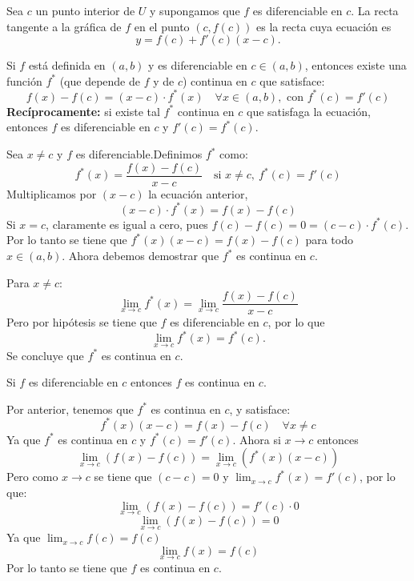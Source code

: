 \begin{definicion}
Sea $c$ un punto interior de $U$ y supongamos que $f$ es diferenciable en $c$. La recta tangente a la gráfica de $f$ en el punto $(c, f(c))$ es la recta  cuya ecuación es 
 \begin{equation}\label{def-tangente}
 y=f(c)+f'(c)(x-c) .
 \end{equation}
\end{definicion}
\begin{teorema}
    Si $f$ está definida en $(a, b)$ y es diferenciable en $c \in (a, b)$, entonces existe una función $f^*$ (que depende de $f$ y de $c$) continua en $c$ que satisface:
\[f(x) - f(c) = (x - c) \cdot f^*(x) \quad \forall x \in (a, b), \text{ con } f^*(c) = f'(c)\]
\textbf{Recíprocamente:} si existe tal $f^*$ continua en $c$ que satisfaga la ecuación, entonces $f$ es diferenciable en $c$ y $f'(c) = f^*(c)$.

\end{teorema}
\begin{prueba}
    Sea $x \neq c$ y $f$ es diferenciable.Definimos $f^{*}$ como:
\[f^*(x) = \frac{f(x) - f(c)}{x - c} \quad \text{si } x \neq c, \ f^*(c) = f'(c)\]
Multiplicamos por $(x - c)$ la ecuación anterior,
\[(x - c) \cdot f^*(x) = f(x) - f(c)\]
Si $x = c$, claramente es igual a cero, pues $f(c) - f(c) = 0 = (c - c) \cdot f^*(c)$. Por lo tanto se tiene que $f^*(x)(x - c) = f(x) - f(c)$ para todo $x \in (a, b)$.
Ahora debemos demostrar que $f^*$ es continua en $c$.

Para $x \neq c$:
\[\lim_{x \to c} f^*(x) = \lim_{x \to c} \frac{f(x) - f(c)}{x - c}\]
Pero por hipótesis se tiene que $f$ es diferenciable en $c$, por lo que
\[\lim_{x \to c} f^*(x) = f^*(c).\]
Se concluye que $f^*$ es continua en $c$.

\end{prueba}
\begin{teorema}
Si $f$ es diferenciable en $c$ entonces $f$ es continua en $c$.
\end{teorema}
\begin{prueba}
    Por anterior, tenemos que $f^*$ es continua en $c$, y satisface:
\[f^*(x)(x-c) = f(x)-f(c) \quad \forall x \neq c\]
Ya que $f^*$ es continua en $c$ y $f^*(c) = f'(c)$.
Ahora si $x \to c$ entonces
\[\lim_{x \to c} (f(x)-f(c)) = \lim_{x \to c} (f^*(x)(x-c))\]
Pero como $x \to c$ se tiene que $(c-c) = 0$ y $\lim_{x \to c} f^*(x) = f'(c)$, por lo que:
\[\lim_{x \to c} (f(x)-f(c)) = f'(c) \cdot 0\]
\[\lim_{x \to c} (f(x) - f(c)) = 0\]
Ya que $\lim_{x \to c} f(c) = f(c)$
\[\lim_{x \to c} f(x) = f(c)\]
Por lo tanto se tiene que $f$ es continua en $c$.

\end{prueba}

